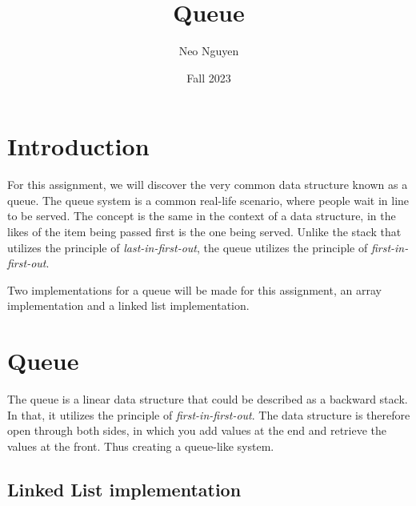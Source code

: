 \documentclass[a4paper,11pt]{article}
\begin{document}
\title{
    \textbf{Queue}
}
\author{Neo Nguyen}
\date{Fall 2023}

\maketitle

\section*{Introduction}

    For this assignment, we will discover the very common data structure known as a queue. The queue system is a common real-life scenario, where people wait in line to be served. The concept is the same in the context of a data structure, in the likes of the item being passed first is the one being served. Unlike the stack that utilizes the principle of \textit{last-in-first-out}, the queue utilizes the principle of \textit{first-in-first-out}.

    Two implementations for a queue will be made for this assignment, an array implementation and a linked list implementation.
    
\section*{Queue}

    The queue is a linear data structure that could be described as a backward stack. In that, it utilizes the principle of \textit{first-in-first-out}. The data structure is therefore open through both sides, in which you add values at the end and retrieve the values at the front. Thus creating a queue-like system.

    \subsection*{Linked List implementation}
\end{document}
